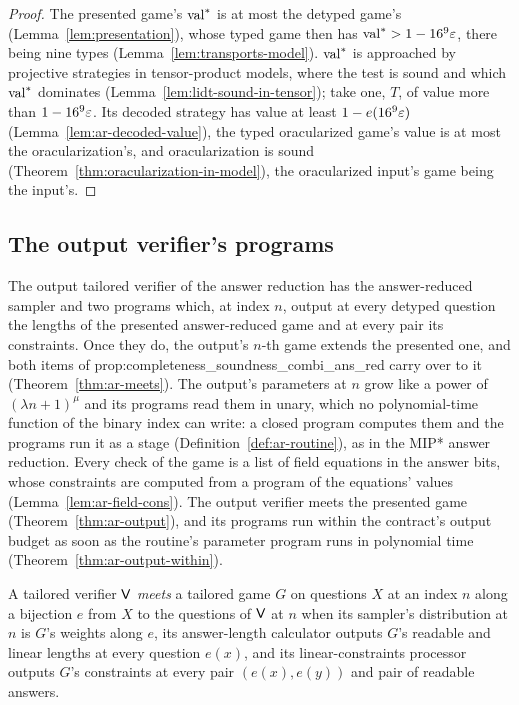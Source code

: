 \begin{proof}
\leanok
The presented game's $\mathrm{val}^*$ is at most the detyped game's (Lemma~\ref{lem:presentation}),
whose typed game then has $\mathrm{val}^* > 1 - 16^9 \varepsilon$, there being nine types
(Lemma~\ref{lem:transports-model}). $\mathrm{val}^*$ is approached by projective strategies in
tensor-product models, where the test is sound and which $\mathrm{val}^*$ dominates
(Lemma~\ref{lem:lidt-sound-in-tensor}); take one, $T$, of value more than $1 - 16^9 \varepsilon$. Its
decoded strategy has value at least $1 - e(16^9 \varepsilon)$ (Lemma~\ref{lem:ar-decoded-value}), the
typed oracularized game's value is at most the oracularization's, and oracularization is sound
(Theorem~\ref{thm:oracularization-in-model}), the oracularized input's game being the input's.
\end{proof}

\subsection{The output verifier's programs}

The output tailored verifier of the answer reduction has the answer-reduced sampler and two
programs which, at index $n$, output at every detyped question the lengths of the presented
answer-reduced game and at every pair its constraints. Once they do, the output's $n$-th game
extends the presented one, and both items of prop:completeness\_soundness\_combi\_ans\_red carry
over to it (Theorem~\ref{thm:ar-meets}). The output's parameters at $n$ grow like a power of
$(\lambda n + 1)^\mu$ and its programs read them in unary, which no polynomial-time function of
the binary index can write: a closed program computes them and the programs run it as a stage
(Definition~\ref{def:ar-routine}), as in the MIP* answer reduction. Every check of the game is a
list of field equations in the answer bits, whose constraints are computed from a program of the
equations' values (Lemma~\ref{lem:ar-field-cons}). The output verifier meets the presented game
(Theorem~\ref{thm:ar-output}), and its programs run within the contract's output budget as soon
as the routine's parameter program runs in polynomial time (Theorem~\ref{thm:ar-output-within}).

\begin{definition}
\label{def:tailored-meets}
\leanok
A tailored verifier $\mathsf{V}$ \emph{meets} a tailored game $G$ on questions $X$ at an index $n$
along a bijection $e$ from $X$ to the questions of $\mathsf{V}$ at $n$ when its sampler's
distribution at $n$ is $G$'s weights along $e$, its answer-length calculator outputs $G$'s
readable and linear lengths at every question $e(x)$, and its linear-constraints processor outputs
$G$'s constraints at every pair $(e(x), e(y))$ and pair of readable answers.
\end{definition}

